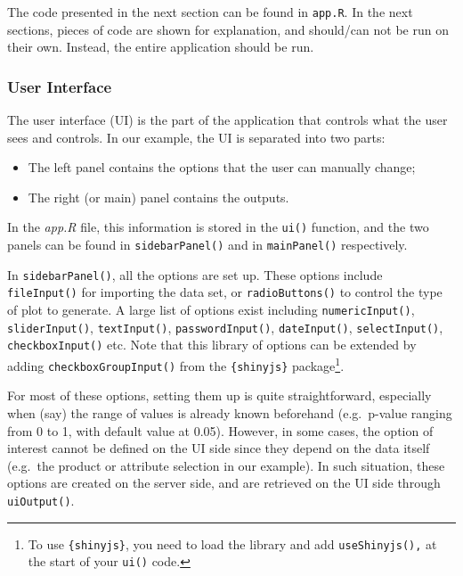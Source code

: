\documentclass[
]{krantz}
\providecommand{\tightlist}{%
  \setlength{\itemsep}{0pt}\setlength{\parskip}{0pt}}
\renewenvironment{quote}{\begin{VF}}{\end{VF}}
\begin{document}
\begin{quote}
The code presented in the next section can be found in \texttt{app.R}. In the next sections, pieces of code are shown for explanation, and should/can not be run on their own. Instead, the entire application should be run.
\end{quote}

\hypertarget{user-interface}{%
\subsubsection{User Interface}\label{user-interface}}

The user interface (UI) is the part of the application that controls what the user sees and controls.
In our example, the UI is separated into two parts:

\begin{itemize}
\tightlist
\item
  The left panel contains the options that the user can manually change;
\item
  The right (or main) panel contains the outputs.
\end{itemize}

In the \emph{app.R} file, this information is stored in the \texttt{ui()} function, and the two panels can be found in \texttt{sidebarPanel()} and in \texttt{mainPanel()} respectively.

In \texttt{sidebarPanel()}, all the options are set up. These options include \texttt{fileInput()} for importing the data set, or \texttt{radioButtons()} to control the type of plot to generate. A large list of options exist including \texttt{numericInput()}, \texttt{sliderInput()}, \texttt{textInput()}, \texttt{passwordInput()}, \texttt{dateInput()}, \texttt{selectInput()}, \texttt{checkboxInput()} etc. Note that this library of options can be extended by adding \texttt{checkboxGroupInput()} from the \texttt{\{shinyjs\}} package\footnote{To use \texttt{\{shinyjs\}}, you need to load the library and add \texttt{useShinyjs(),} at the start of your \texttt{ui()} code.}.

For most of these options, setting them up is quite straightforward, especially when (say) the range of values is already known beforehand (e.g.~p-value ranging from 0 to 1, with default value at 0.05). However, in some cases, the option of interest cannot be defined on the UI side since they depend on the data itself (e.g.~the product or attribute selection in our example). In such situation, these options are created on the server side, and are retrieved on the UI side through \texttt{uiOutput()}.
\end{document}
